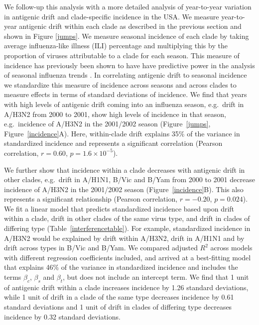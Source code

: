 \documentclass[11pt,oneside,letterpaper]{article}
\newcommand{\bwithin}{\beta_c}		%
\newcommand{\bsister}{\beta_s}		%
\newcommand{\bother}{\beta_t}			%
\begin{document}
We follow-up this analysis with a more detailed analysis of year-to-year variation in antigenic drift and clade-specific incidence in the USA.
We measure year-to-year antigenic drift within each clade as described in the previous section and shown in Figure \ref{jumps}.
We measure seasonal incidence of each clade by taking average influenza-like illness (ILI) percentage and multiplying this by the proportion of viruses attributable to a clade for each season.
This measure of incidence has previously been shown to have have predictive power in the analysis of seasonal influenza trends \cite{Goldstein11}.
In correlating antigenic drift to seasonal incidence we standardize this measure of incidence across seasons and across clades to measure effects in terms of standard deviations of incidence.
We find that years with high levels of antigenic drift coming into an influenza season, e.g.\ drift in A/H3N2 from 2000 to 2001, show high levels of incidence in that season, e.g.\ incidence of A/H3N2 in the 2001/2002 season (Figure~\ref{jumps}, Figure~\ref{incidence}A). 
Here, within-clade drift explains 35\% of the variance in standardized incidence and represents a significant correlation (Pearson correlation, $r=0.60$, $p=1.6 \times 10^{-5}$).

We further show that incidence within a clade decreases with antigenic drift in other clades, e.g.\ drift in A/H1N1, B/Vic and B/Yam from 2000 to 2001 decrease incidence of A/H3N2 in the 2001/2002 season (Figure~\ref{incidence}B).
This also represents a significant relationship (Pearson correlation, $r=-0.20$, $p=0.024$).
We fit a linear model that predicts standardized incidence based upon drift within a clade, drift in other clades of the same virus type, and drift in clades of differing type (Table~\ref{interferencetable}).
For example, standardized incidence in A/H3N2 would be explained by drift within A/H3N2, drift in A/H1N1 and by drift across types in B/Vic and B/Yam.
We compared adjusted $R^2$ across models with different regression coefficients included, and arrived at a best-fitting model that explains 46\% of the variance in standardized incidence and includes the terms $\bwithin$, $\bsister$ and $\bother$, but does not include an intercept term.
We find that 1 unit of antigenic drift within a clade increases incidence by 1.26 standard deviations, while 1 unit of drift in a clade of the same type decreases incidence by 0.61 standard deviations and 1 unit of drift in clades of differing type decreases incidence by 0.32 standard deviations.
\end{document}
